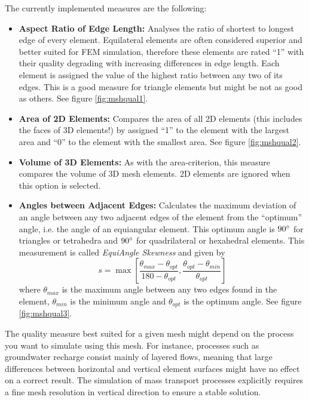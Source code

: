 The currently implemented measures are the following:
\begin{itemize}
\item \textbf{Aspect Ratio of Edge Length:} Analyses the ratio of shortest to longest edge of every element. Equilateral elements are often considered superior and better suited for FEM simulation, therefore these elements are rated ``1'' with their quality degrading with increasing differences in edge length. Each element is assigned the value of the highest ratio between any two of its edges. This is a good measure for triangle elements but might be not as good as others. See figure \ref{fig:mshqual1}.
\item \textbf{Area of 2D Elements:} Compares the area of all 2D elements (this includes the faces of 3D elements!) by assigned ``1'' to the element with the largest area and ``0'' to the element with the smallest area. See figure \ref{fig:mshqual2}.
\item \textbf{Volume of 3D Elements:} As with the area-criterion, this measure compares the volume of 3D mesh elements. 2D elements are ignored when this option is selected.
\item \textbf{Angles between Adjacent Edges:} Calculates the maximum deviation of an angle between any two adjacent edges of the element from the ``optimum'' angle, i.e. the angle of an equiangular element. This optimum angle is $90^\circ$ for triangles or tetrahedra and $90^\circ$ for quadrilateral or hexahedral elements. This measurement is called \emph{EquiAngle Skewness} and given by
    \begin{equation}
    s = \max\left[\frac{\theta_{max}-\theta_{opt}}{180-\theta_{opt}},\frac{\theta_{opt}-\theta_{min}}{\theta_{opt}}\right]
    \end{equation}
    where $\theta_{max}$ is the maximum angle between any two edges found in the element, $\theta_{min}$ is the minimum angle and $\theta_{opt}$ is the optimum angle.
    See figure \ref{fig:mshqual3}.
\end{itemize}

The quality measure best suited for a given mesh might depend on the process you want to simulate using this mesh. For instance, processes such as groundwater recharge consist mainly of layered flows, meaning that large differences between horizontal and vertical element surfaces might have no effect on a correct result. The simulation of mass transport processes explicitly requires a fine mesh resolution in vertical direction to ensure a stable solution.

